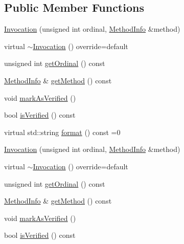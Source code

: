 \subsection*{Public Member Functions}
\begin{DoxyCompactItemize}
\item 
\mbox{\hyperlink{structfakeit_1_1Invocation_a65e80c1f6eb1c04f7e6c48df5bd229a6}{Invocation}} (unsigned int ordinal, \mbox{\hyperlink{structfakeit_1_1MethodInfo}{Method\+Info}} \&method)
\item 
virtual \mbox{\hyperlink{structfakeit_1_1Invocation_a027b5d4605055387939c6e37cb01a427}{$\sim$\+Invocation}} () override=default
\item 
unsigned int \mbox{\hyperlink{structfakeit_1_1Invocation_a86b6f74924a9fed6b8760c2ba86a249b}{get\+Ordinal}} () const
\item 
\mbox{\hyperlink{structfakeit_1_1MethodInfo}{Method\+Info}} \& \mbox{\hyperlink{structfakeit_1_1Invocation_ae0b909794e14d6bba7db6baaef471865}{get\+Method}} () const
\item 
void \mbox{\hyperlink{structfakeit_1_1Invocation_a4579628568d7b469a1d225b3d43822e5}{mark\+As\+Verified}} ()
\item 
bool \mbox{\hyperlink{structfakeit_1_1Invocation_ae1c4e0840951bd5be209fd02196ecc59}{is\+Verified}} () const
\item 
virtual std\+::string \mbox{\hyperlink{structfakeit_1_1Invocation_ad6bf5d7b6ae2897c5d6bbb51183b8c1d}{format}} () const =0
\item 
\mbox{\hyperlink{structfakeit_1_1Invocation_a65e80c1f6eb1c04f7e6c48df5bd229a6}{Invocation}} (unsigned int ordinal, \mbox{\hyperlink{structfakeit_1_1MethodInfo}{Method\+Info}} \&method)
\item 
virtual \mbox{\hyperlink{structfakeit_1_1Invocation_a027b5d4605055387939c6e37cb01a427}{$\sim$\+Invocation}} () override=default
\item 
unsigned int \mbox{\hyperlink{structfakeit_1_1Invocation_a86b6f74924a9fed6b8760c2ba86a249b}{get\+Ordinal}} () const
\item 
\mbox{\hyperlink{structfakeit_1_1MethodInfo}{Method\+Info}} \& \mbox{\hyperlink{structfakeit_1_1Invocation_ae0b909794e14d6bba7db6baaef471865}{get\+Method}} () const
\item 
void \mbox{\hyperlink{structfakeit_1_1Invocation_a4579628568d7b469a1d225b3d43822e5}{mark\+As\+Verified}} ()
\item 
bool \mbox{\hyperlink{structfakeit_1_1Invocation_ae1c4e0840951bd5be209fd02196ecc59}{is\+Verified}} () const

\end{DoxyCompactItemize}
